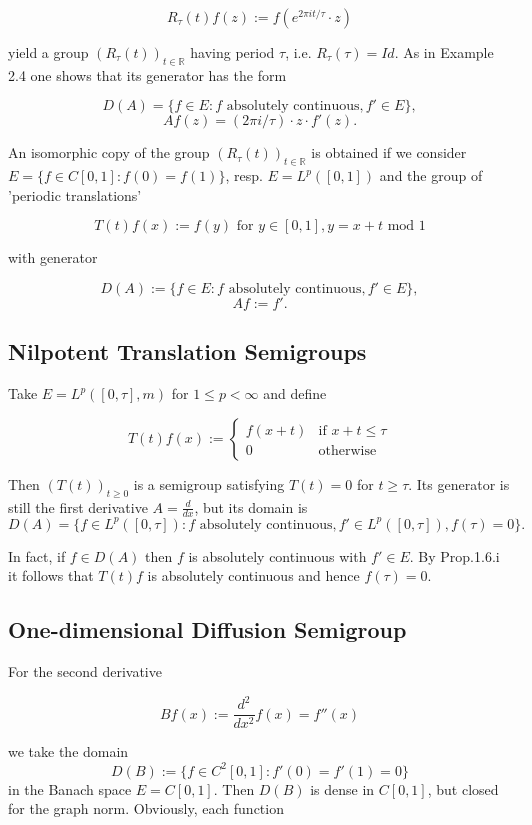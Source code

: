 \documentclass{article}
\begin{document}
\[
R_\tau(t)f(z) := f(e^{2\pi it/\tau} \cdot z)
\]

yield a group $(R_\tau(t))_{t \in \mathbb{R}}$ having period $\tau$, i.e. $R_\tau(\tau)=Id$.
As in Example 2.4 one shows that its generator has the form

\[
D(A) = \{f \in E: f \text{ absolutely continuous}, f' \in E\},
\]
\[
Af(z) = (2\pi i/\tau) \cdot z \cdot f'(z).
\]

An isomorphic copy of the group $(R_\tau(t))_{t \in \mathbb{R}}$ is obtained if we consider $E=\{f \in C[0,1]: f(0)=f(1)\}$, resp. $E=L^p([0,1])$ and the group of 'periodic translations'

\[
T(t)f(x) := f(y) \text{ for } y \in [0,1], y = x+t \text{ mod } 1
\]

with generator

\[
D(A) := \{f \in E: f \text{ absolutely continuous}, f' \in E\},
\]
\[
Af := f'.
\]

\subsection{Nilpotent Translation Semigroups}
Take $E=L^p([0,\tau],m)$ for $1 \leq p < \infty$ and define

\[
T(t)f(x) := \begin{cases}
f(x+t) & \text{if } x+t \leq \tau \\
0 & \text{otherwise}
\end{cases}
\]

Then $(T(t))_{t \geq 0}$ is a semigroup satisfying $T(t)=0$ for $t \geq \tau$.
Its generator is still the first derivative $A=\frac{d}{dx}$, but its domain is
\[
D(A) = \{f \in L^p([0,\tau]): f \text{ absolutely continuous}, f' \in L^p([0,\tau]), f(\tau)=0\}.
\]

In fact, if $f \in D(A)$ then $f$ is absolutely continuous with $f' \in E$.
By Prop.1.6.i it follows that $T(t)f$ is absolutely continuous and hence $f(\tau)=0$.

\subsection{One-dimensional Diffusion Semigroup}
For the second derivative

\[
Bf(x) := \frac{d^2}{dx^2}f(x) = f''(x)
\]

we take the domain
\[
D(B) := \{f \in C^2[0,1]: f'(0)=f'(1)=0\}
\]
in the Banach space $E=C[0,1]$.
Then $D(B)$ is dense in $C[0,1]$, but closed for the graph norm.
Obviously, each function
\end{document}

